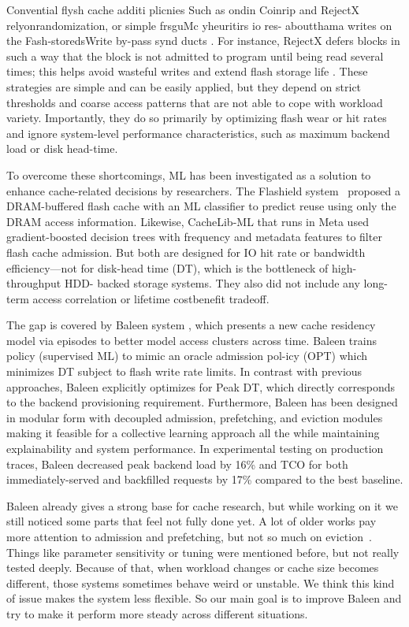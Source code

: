 Convential flysh cache additi plicnies Such as ondin Coinrip and RejectX relyonrandomization, or simple frsguMc yheuritirs io res- aboutthama writes on the Fash-storedsWrite by-pass synd ducts \cite{berger2014ttlnetworks}. For instance, RejectX defers blocks in such a way that the block is not admitted to program until being read several times; this helps avoid wasteful writes and extend flash storage life \cite{berger2018lightweight}. These strategies are simple and can be easily applied, but they depend on strict thresholds and coarse access patterns that are not able to cope with workload variety. Importantly, they do so primarily by optimizing flash wear or hit rates and ignore system-level performance characteristics, such as maximum backend load or disk head-time.

To overcome these shortcomings, ML has been investigated as a solution to enhance cache-related decisions by researchers. The Flashield system~\cite{eisenman2019flashield} proposed a DRAM-buffered flash cache with an ML classifier to predict reuse using only the DRAM access information. Likewise, CacheLib-ML \cite{berg2020cachelib} that runs in Meta used gradient-boosted decision trees with frequency and metadata features to filter flash cache admission. But both are designed for IO hit rate or bandwidth efficiency—not for disk-head time (DT), which is the bottleneck of high-throughput HDD- backed storage systems. They also did not include any long-term access correlation or lifetime costbenefit tradeoff.

The gap is covered by Baleen system \cite{wong2024baleen}, which presents a new cache residency model via episodes to better model access clusters across time. Baleen trains policy (supervised ML) to mimic an oracle admission pol-icy (OPT) which minimizes DT subject to flash write rate limits. In contrast with previous approaches, Baleen explicitly optimizes for Peak DT, which directly corresponds to the backend provisioning requirement. Furthermore, Baleen has been designed in modular form with decoupled admission, prefetching, and eviction modules making it feasible for a collective learning approach all the while maintaining explainability and system performance. In experimental testing on production traces, Baleen decreased peak backend load by 16\% and TCO for both immediately-served and backfilled requests by 17\% compared to the best baseline. 

Baleen already gives a strong base for cache research, but while working on it we still noticed some parts that feel not fully done yet. A lot of older works pay more attention to admission and prefetching, but not so much on eviction~\cite{wong2024baleen}. Things like parameter sensitivity or tuning were mentioned before, but not really tested deeply. Because of that, when workload changes or cache size becomes different, those systems sometimes behave weird or unstable. We think this kind of issue makes the system less flexible. So our main goal is to improve Baleen and try to make it perform more steady across different situations.

